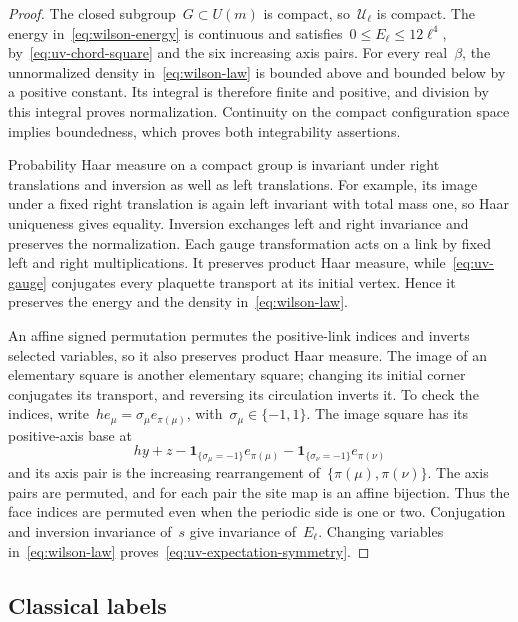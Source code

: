 \begin{proof}
The closed subgroup~$G\subset U(m)$ is compact, so~$\mathcal U_\ell$ is compact.
The energy in~\eqref{eq:wilson-energy} is continuous and satisfies~$0\le E_\ell\le12\ell^4$, by~\eqref{eq:uv-chord-square} and the six increasing axis pairs.
For every real~$\beta$, the unnormalized density in~\eqref{eq:wilson-law} is bounded above and bounded below by a positive constant.
Its integral is therefore finite and positive, and division by this integral proves normalization.
Continuity on the compact configuration space implies boundedness, which proves both integrability assertions.

Probability Haar measure on a compact group is invariant under right translations and inversion as well as left translations.
For example, its image under a fixed right translation is again left invariant with total mass one, so Haar uniqueness gives equality.
Inversion exchanges left and right invariance and preserves the normalization.
Each gauge transformation acts on a link by fixed left and right multiplications.
It preserves product Haar measure, while~\eqref{eq:uv-gauge} conjugates every plaquette transport at its initial vertex.
Hence it preserves the energy and the density in~\eqref{eq:wilson-law}.

An affine signed permutation permutes the positive-link indices and inverts selected variables, so it also preserves product Haar measure.
The image of an elementary square is another elementary square; changing its initial corner conjugates its transport, and reversing its circulation inverts it.
To check the indices, write~$he_\mu=\sigma_\mu e_{\pi(\mu)}$, with~$\sigma_\mu\in\{-1,1\}$.
The image square has its positive-axis base at
\begin{equation*}
 hy+z-\mathbf1_{\{\sigma_\mu=-1\}}e_{\pi(\mu)}
      -\mathbf1_{\{\sigma_\nu=-1\}}e_{\pi(\nu)}
\end{equation*}
and its axis pair is the increasing rearrangement of~$\{\pi(\mu),\pi(\nu)\}$.
The axis pairs are permuted, and for each pair the site map is an affine bijection.
Thus the face indices are permuted even when the periodic side is one or two.
Conjugation and inversion invariance of~$s$ give invariance of~$E_\ell$.
Changing variables in~\eqref{eq:wilson-law} proves~\eqref{eq:uv-expectation-symmetry}.
\end{proof}

\subsection{Classical labels}

